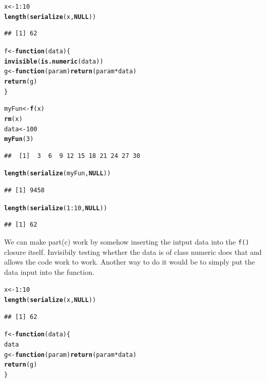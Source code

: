 \documentclass{article}\usepackage[]{graphicx}\usepackage[]{color}
\makeatletter
\newcommand{\hlnum}[1]{\textcolor[rgb]{0.686,0.059,0.569}{#1}}%
\newcommand{\hlopt}[1]{\textcolor[rgb]{0,0,0}{#1}}%
\newcommand{\hlstd}[1]{\textcolor[rgb]{0.345,0.345,0.345}{#1}}%
\newcommand{\hlkwa}[1]{\textcolor[rgb]{0.161,0.373,0.58}{\textbf{#1}}}%
\newcommand{\hlkwb}[1]{\textcolor[rgb]{0.69,0.353,0.396}{#1}}%
\newcommand{\hlkwc}[1]{\textcolor[rgb]{0.333,0.667,0.333}{#1}}%
\newcommand{\hlkwd}[1]{\textcolor[rgb]{0.737,0.353,0.396}{\textbf{#1}}}%
\newenvironment{kframe}{%
 \def\at@end@of@kframe{}%
 \ifinner\ifhmode%
  \def\at@end@of@kframe{\end{minipage}}%
  \begin{minipage}{\columnwidth}%
 \fi\fi%
 \def\FrameCommand##1{\hskip\@totalleftmargin \hskip-\fboxsep
 \colorbox{shadecolor}{##1}\hskip-\fboxsep
     \hskip-\linewidth \hskip-\@totalleftmargin \hskip\columnwidth}%
 \MakeFramed {\advance\hsize-\width
   \@totalleftmargin\z@ \linewidth\hsize
   \@setminipage}}%
 {\par\unskip\endMakeFramed%
 \at@end@of@kframe}
\newenvironment{knitrout}{}{} %
\makeatother
\begin{document}
\begin{knitrout}
\color{fgcolor}\begin{kframe}
\begin{alltt}
\hlstd{x} \hlkwb{<-} \hlnum{1}\hlopt{:}\hlnum{10}
\hlkwd{length}\hlstd{(}\hlkwd{serialize}\hlstd{(x,} \hlkwa{NULL}\hlstd{))}
\end{alltt}
\begin{verbatim}
## [1] 62
\end{verbatim}
\begin{alltt}
\hlstd{f} \hlkwb{<-} \hlkwa{function}\hlstd{(}\hlkwc{data}\hlstd{)\{}
    \hlkwd{invisible}\hlstd{(}\hlkwd{is.numeric}\hlstd{(data))}
    \hlstd{g} \hlkwb{<-} \hlkwa{function}\hlstd{(}\hlkwc{param}\hlstd{)} \hlkwd{return}\hlstd{(param} \hlopt{*} \hlstd{data)}
    \hlkwd{return}\hlstd{(g)}
\hlstd{\}}

\hlstd{myFun} \hlkwb{<-} \hlkwd{f}\hlstd{(x)}
\hlkwd{rm}\hlstd{(x)}
\hlstd{data} \hlkwb{<-} \hlnum{100}
\hlkwd{myFun}\hlstd{(}\hlnum{3}\hlstd{)}
\end{alltt}
\begin{verbatim}
##  [1]  3  6  9 12 15 18 21 24 27 30
\end{verbatim}
\begin{alltt}
\hlkwd{length}\hlstd{(}\hlkwd{serialize}\hlstd{(myFun,} \hlkwa{NULL}\hlstd{))}
\end{alltt}
\begin{verbatim}
## [1] 9458
\end{verbatim}
\begin{alltt}
\hlkwd{length}\hlstd{(}\hlkwd{serialize}\hlstd{(}\hlnum{1}\hlopt{:}\hlnum{10}\hlstd{,} \hlkwa{NULL}\hlstd{))}
\end{alltt}
\begin{verbatim}
## [1] 62
\end{verbatim}
\end{kframe}
\end{knitrout}

We can make part(c) work by somehow inserting the intput data into the \texttt{f()} closure itself. Invisibily testing whether the data is of class numeric does that and allows the code work to work. Another way to do it would be to simply put the data input into the function.
\begin{knitrout}
\color{fgcolor}\begin{kframe}
\begin{alltt}
\hlstd{x} \hlkwb{<-} \hlnum{1}\hlopt{:}\hlnum{10}
\hlkwd{length}\hlstd{(}\hlkwd{serialize}\hlstd{(x,} \hlkwa{NULL}\hlstd{))}
\end{alltt}
\begin{verbatim}
## [1] 62
\end{verbatim}
\begin{alltt}
\hlstd{f} \hlkwb{<-} \hlkwa{function}\hlstd{(}\hlkwc{data}\hlstd{)\{}
    \hlstd{data}
    \hlstd{g} \hlkwb{<-} \hlkwa{function}\hlstd{(}\hlkwc{param}\hlstd{)} \hlkwd{return}\hlstd{(param} \hlopt{*} \hlstd{data)}
    \hlkwd{return}\hlstd{(g)}
\hlstd{\}}
\end{alltt}
\end{kframe}
\end{knitrout}
\end{document}
